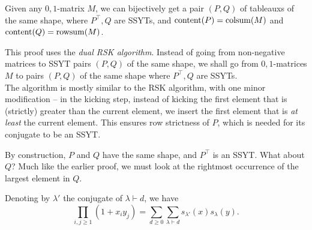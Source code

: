 	\begin{ftheo}
		Given any $0,1$-matrix $M$, we can bijectively get a pair $(P,Q)$ of tableauxs of the same shape, where $P^\top, Q$ are SSYTs, and $\operatorname{content}(P) = \operatorname{colsum}(M)$ and $\operatorname{content}(Q) = \operatorname{rowsum}(M)$.  
	\end{ftheo}

	This proof uses the \emph{dual RSK algorithm}. Instead of going from non-negative matrices to SSYT pairs $(P,Q)$ of the same shape, we shall go from $0,1$-matrices $M$ to pairs $(P,Q)$ of the same shape where $P^\top,Q$ are SSYTs.\\
	The algorithm is mostly similar to the RSK algorithm, with one minor modification -- in the kicking step, instead of kicking the first element that is (strictly) greater than the current element, we insert the first element that is \emph{at least} the current element. This ensures row strictness of $P$, which is needed for its conjugate to be an SSYT.









	By construction, $P$ and $Q$ have the same shape, and $P^\top$ is an SSYT. What about $Q$? Much like the earlier proof, we must look at the rightmost occurrence of the largest element in $Q$.


	\begin{fcor}
		Denoting by $\lambda'$ the conjugate of $\lambda \vdash d$, we have
		\[ \prod_{i,j \ge 1} (1+x_iy_j) = \sum_{d \ge 0} \sum_{\lambda \vdash d} s_{\lambda'}(x) s_\lambda(y). \]
	\end{fcor}

